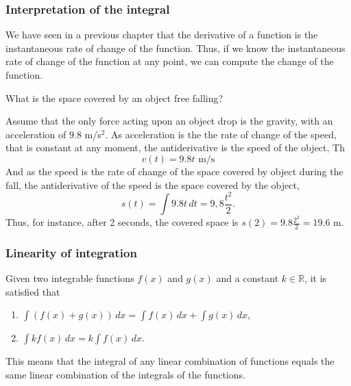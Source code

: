 \begin{frame}
\frametitle{Interpretation of the integral}
We have seen in a previous chapter that the derivative of a function is the instantaneous rate of change of the function. 
Thus, if we know the instantaneous rate of change of the function at any point, we can compute the change of the function.

 What is the space covered by an object free falling?

Assume that the only force acting upon an object drop is the gravity, with an acceleration of $9.8$ m/s$^2$. 
As acceleration is the the rate of change of the speed, that is constant at any moment, the antiderivative is the speed of the object, 
Th
\[
v(t) = 9.8t  \mbox{ m/s}
\] 
And as the speed is the rate of change of the space covered by object during the fall, the antiderivative of the speed is the space covered by the object, 
\[
s(t) = \int 9.8t\, dt = 9,8\frac{t^2}{2}.
\]
Thus, for instance, after 2 seconds, the covered space is $s(2) = 9.8\frac{2^2}{2} = 19.6$ m.
\end{frame}


\begin{frame}
\frametitle{Linearity of integration}
Given two integrable functions $f(x)$ and $g(x)$ and a constant $k \in \mathbb{R}$, it is satisfied that
\begin{enumerate}
\item $\int{(f(x)+g(x))}\,dx=\int{f(x)}\,dx+\int{g(x)}\,dx$,

\item $\int{kf(x)}\,dx=k\int{f(x)}\,dx$.
\end{enumerate}

This means that the integral of any linear combination of functions equals the same linear combination of the integrals of the functions.
\end{frame}



